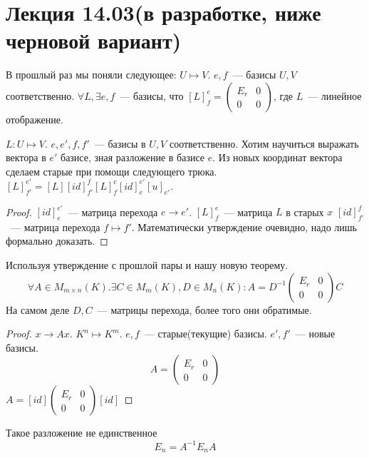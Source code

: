 \section{Лекция 14.03(в разработке, ниже черновой вариант)}
В прошлый раз мы поняли следующее:
$U\mapsto V$.
$e,f$~--- базисы $U, V$ соответственно.
$\forall L, \exists e,f$~--- базисы,
что $[L]_f^e=
\left(\begin{array}{c|c}
        E_r & 0\\
        \hline
        0 & 0
\end{array}\right)$, где $L$~--- линейное отображение.

\begin{theorem}
    $L: U\mapsto V$. 
    $e, e', f, f'$~--- базисы в $U, V$ соответственно.
    Хотим научиться выражать вектора в $e'$ базисе, зная разложение
    в базисе $e$.
    Из новых координат вектора сделаем старые при помощи следующего трюка.
    $[L]^{e'}_{f'}=[L][id]_{f'}^{f}[L]_f^{e}[id]_e^{e'}[u]_{e'}$.
\end{theorem}
\begin{proof}
    $[id]_{e}^{e'}$~--- матрица перехода $e\rightarrow e'$.
    $[L]_f^e$~--- матрица $L$ в старых $x$
    $[id]_{f'}^f$~--- матрица перехода $f\mapsto f'$.
    Математически утверждение очевидно, надо лишь формально доказать.
\end{proof}
\begin{follow}
    Используя утверждение с прошлой пары и нашу новую теорему.
    $$\forall A\in M_{m\times n}(K).
    \exists C\in M_m(K), D\in M_n(K): A = D^{-1}
    \begin{pmatrix}
        E_r & 0\\
        0 & 0
    \end{pmatrix}C$$
    На самом деле $D, C$~--- матрицы перехода, более того они
    обратимые.
\end{follow}
\begin{proof}
    $x\rightarrow Ax$.
    $K^n\mapsto K^m$.
    $e, f$~--- старые(текущие) базисы.
    $e', f'$~--- новые базисы.
    $$A = \begin{pmatrix}
         E_r & 0\\
         0 & 0
        \end{pmatrix}
    $$
    $A = [id]\begin{pmatrix}
        E_r & 0\\
        0 & 0
    \end{pmatrix}[id]$
\end{proof}
\begin{remark}
    Такое разложение не единственное
    $$
    E_n = A^{-1}E_nA
    $$
\end{remark}
